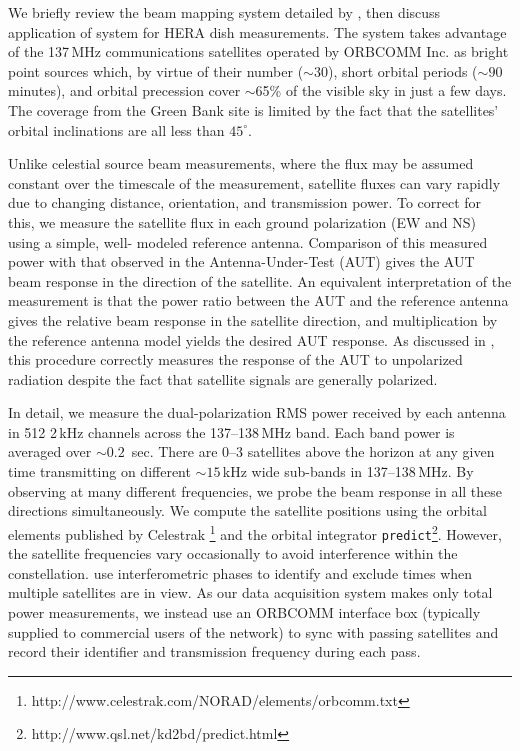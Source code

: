 \documentclass{emulateapj}
\begin{document}
We briefly review the beam mapping system detailed by \citet{neben15}, then discuss 
application of system for HERA dish measurements. The system 
takes advantage of the 137\,MHz communications satellites operated by ORBCOMM Inc. 
as bright point sources which, by virtue of their number ($\sim30$), short orbital periods 
($\sim90$ minutes), and orbital precession cover $\sim$65\% of the visible sky in just a few 
days. The coverage from the Green Bank site is limited by the fact that the satellites' orbital inclinations are all less 
than $45^\circ$. 

Unlike celestial source beam measurements, where the flux may be 
assumed constant over the timescale of the measurement, satellite fluxes can vary rapidly 
due to changing distance, orientation, and transmission power. To correct for this, we 
measure the satellite flux in each ground polarization (EW and NS) using a simple, well-
modeled reference antenna. Comparison of this measured power with that observed in the 
Antenna-Under-Test (AUT) gives the AUT beam response in the direction of the satellite. 
An equivalent interpretation of the measurement is that the power ratio between the AUT and the reference 
antenna gives the relative beam response in the satellite direction, and multiplication by 
the reference antenna model yields the desired AUT response. As discussed in 
\citet{neben15}, this procedure correctly measures the response of the AUT to unpolarized radiation
 despite the fact that satellite signals are generally polarized.

In detail, we measure the dual-polarization RMS power received by each antenna in 512 2\,kHz 
channels across the 137--138\,MHz band. Each band power is averaged over $\sim0.2$
\,sec. There are 0--3 satellites above the horizon at any given time transmitting on different 
$\sim15$\,kHz wide sub-bands in 137--138\,MHz. By observing at many different 
frequencies, we probe the beam response in all these directions simultaneously. We 
compute the satellite positions using the orbital elements published by Celestrak
\footnote{http://www.celestrak.com/NORAD/elements/orbcomm.txt} and the orbital 
integrator \texttt{predict}\footnote{http://www.qsl.net/kd2bd/predict.html}. However, the 
satellite frequencies vary occasionally to avoid interference within the constellation. 
\citet{zheng14} use interferometric phases to identify and exclude times when multiple 
satellites are in view. As our data acquisition system makes only total power 
measurements, we instead use an ORBCOMM interface box (typically supplied to 
commercial users of the network) to sync with passing satellites and record their identifier 
and transmission frequency during each pass.
\end{document}
